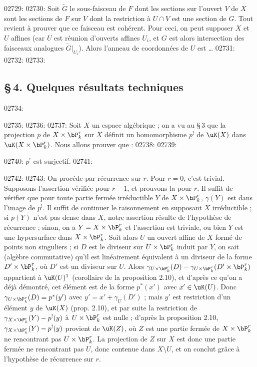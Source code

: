 02729: 
02730: Soit $\widetilde{G}$ le sous-faisceau de $F$ dont les sections sur l'ouvert $V$ de $X$ sont les sections de $F$ sur $V$ dont la restriction \`a $U \cap V$ est une section de $G$. Tout revient \`a prouver que ce faisceau est coh\'erent. Pour ceci, on peut supposer $X$ et $U$ affines (car $U$ est r\'eunion d'ouverts affines $U_i$, et $G$ est alors intersection des faisceaux analogues $\widetilde{G}|_{U_i}$). Alors l'anneau de coordonn\'ees de $U$ est \ldots
02731: 
02732: %
02733: \subsection*{\S\,4. Quelques r\'esultats techniques}
02734: 
02735: %
02736: 
02737: Soit $X$ un espace alg\'ebrique ; on a vu au \S\,3 que la projection $p$ de $X \times \bP_k^r$ sur $X$ d\'efinit un homomorphisme $p^!$ de $\uK(X)$ dans $\uK(X \times \bP_k^r)$. Nous allons prouver que :
02738: 
02739: \begin{proposition}\label{prop:2.10}
02740: $p^!$ est surjectif.
02741: \end{proposition}
02742: 
02743: On proc\'ede par r\'ecurrence sur $r$. Pour $r = 0$, c'est trivial. Supposons l'assertion v\'erifi\'ee pour $r - 1$, et prouvons-la pour $r$. Il suffit de v\'erifier que pour toute partie ferm\'ee irr\'eductible $Y$ de $X \times \bP_k^r$, $\gamma(Y)$ est dans l'image de $p^!$. Il suffit de continuer le raisonnement en supposant $X$ irr\'eductible ; si $p(Y)$ n'est pas dense dans $X$, notre assertion r\'esulte de l'hypoth\`ese de r\'ecurrence ; sinon, on a $Y = X \times \bP_k^r$ et l'assertion est triviale, ou bien $Y$ est une hypersurface dans $X \times \bP_k^r$. Soit alors $U$ un ouvert affine de $X$ form\'e de points non singuliers ; si $D$ est le diviseur sur $U \times \bP_k^r$ induit par $Y$, on sait (alg\`ebre commutative) qu'il est lin\'eairement \'equivalent \`a un diviseur de la forme $D' \times \bP_k^r$, o\`u $D'$ est un diviseur sur $U$. Alors $\gamma_{U \times \bP_k^r}(D) - \gamma_{U \times \bP_k^r}(D' \times \bP_k^r)$ appartient \`a $\uK(U)^1$ (corollaire de la proposition 2.10), et d'apr\`es ce qu'on a d\'ej\`a d\'emontr\'e, cet \'el\'ement est de la forme $p^*(x')$ avec $x' \in \uK(U)$. Donc $\gamma_{U \times \bP_k^r}(D) = p^*(y')$ avec $y' = x' + \gamma_U(D')$ ; mais $y'$ est restriction d'un \'el\'ement $y$ de $\uK(X)$ (prop. 2.10), et par suite la restriction de $\gamma_{X \times \bP_k^r}(Y) - p^!(y)$ \`a $U \times \bP_k^r$ est nulle ; d'apr\`es la proposition 2.10, $\gamma_{X \times \bP_k^r}(Y) - p^!(y)$ provient de $\uK(Z)$, o\`u $Z$ est une partie ferm\'ee de $X \times \bP_k^r$ ne rencontrant pas $U \times \bP_k^r$. La projection de $Z$ sur $X$ est donc une partie ferm\'ee ne rencontrant pas $U$, donc contenue dans $X \setminus U$, et on conclut gr\^ace \`a l'hypoth\`ese de r\'ecurrence sur $r$.

